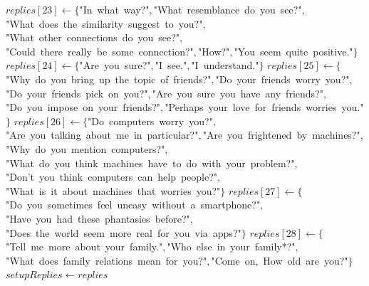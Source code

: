 \documentclass[a4paper,10pt]{article}
\begin{document}
\begin{function}
{  \(replies[23]\leftarrow{}\{\)"{}In\ what\ way?"{}\(,\)"{}What\ resemblance\ do\ you\ see?"{}\(,\)"{}What\ does\ the\ similarity\ suggest\ to\ you?"{}\(,\)"{}What\ other\ connections\ do\ you\ see?"{}\(,\)"{}Could\ there\ really\ be\ some\ connection?"{}\(,\)"{}How?"{}\(,\)"{}You\ seem\ quite\ positive."{}\(\}\)\;
  \(replies[24]\leftarrow{}\{\)"{}Are\ you\ sure?"{}\(,\)"{}I\ see."{}\(,\)"{}I\ understand."{}\(\}\)\;
  \(replies[25]\leftarrow{}\{\)"{}Why\ do\ you\ bring\ up\ the\ topic\ of\ friends?"{}\(,\)"{}Do\ your\ friends\ worry\ you?"{}\(,\)"{}Do\ your\ friends\ pick\ on\ you?"{}\(,\)"{}Are\ you\ sure\ you\ have\ any\ friends?"{}\(,\)"{}Do\ you\ impose\ on\ your\ friends?"{}\(,\)"{}Perhaps\ your\ love\ for\ friends\ worries\ you."{}\(\}\)\;
  \(replies[26]\leftarrow{}\{\)"{}Do\ computers\ worry\ you?"{}\(,\)"{}Are\ you\ talking\ about\ me\ in\ particular?"{}\(,\)"{}Are\ you\ frightened\ by\ machines?"{}\(,\)"{}Why\ do\ you\ mention\ computers?"{}\(,\)"{}What\ do\ you\ think\ machines\ have\ to\ do\ with\ your\ problem?"{}\(,\)"{}Don'{}t\ you\ think\ computers\ can\ help\ people?"{}\(,\)"{}What\ is\ it\ about\ machines\ that\ worries\ you?"{}\(\}\)\;
  \(replies[27]\leftarrow{}\{\)"{}Do\ you\ sometimes\ feel\ uneasy\ without\ a\ smartphone?"{}\(,\)"{}Have\ you\ had\ these\ phantasies\ before?"{}\(,\)"{}Does\ the\ world\ seem\ more\ real\ for\ you\ via\ apps?"{}\(\}\)\;
  \(replies[28]\leftarrow{}\{\)"{}Tell\ me\ more\ about\ your\ family."{}\(,\)"{}Who\ else\ in\ your\ family*?"{}\(,\)"{}What\ does\ family\ relations\ mean\ for\ you?"{}\(,\)"{}Come\ on,\ How\ old\ are\ you?"{}\(\}\)\;
  \(setupReplies\leftarrow{}replies\)\;
}
\end{function}


\begin{function}
\caption{findKeyword(keyMap, sentence)}
\end{function}
\end{document}
